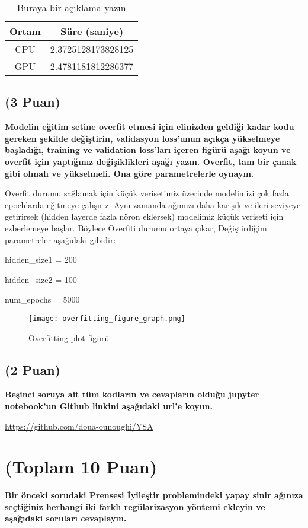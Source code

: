 \documentclass[11pt]{article}
\begin{document}
\begin{table}[ht!]
    \centering
    \caption{Buraya bir açıklama yazın}
    \begin{tabular}{c|c}
        Ortam & Süre (saniye) \\\hline
        CPU & 2.3725128173828125 \\
        GPU & 2.4781181812286377\\
    \end{tabular}
    \label{tab:my_table}
\end{table}

\subsection{(3 Puan)} \textbf{Modelin eğitim setine overfit etmesi için elinizden geldiği kadar kodu gereken şekilde değiştirin, validasyon loss'unun açıkça yükselmeye başladığı, training ve validation loss'ları içeren figürü aşağı koyun ve overfit için yaptığınız değişiklikleri aşağı yazın. Overfit, tam bir çanak gibi olmalı ve yükselmeli. Ona göre parametrelerle oynayın.}

Overfit durumu sağlamak için küçük verisetimiz üzerinde modelimizi çok fazla epochlarda eğitmeye çalışırız. Aynı zamanda ağımızı daha karışık ve ileri seviyeye getirirsek (hidden layerde fazla nöron eklersek) modelimiz küçük veriseti için ezberlemeye başlar. Böylece Overfiti durumu ortaya çıkar,
Değiştirdiğim parametreler aşağıdaki gibidir:

 hidden\_size1 = 200
 
 hidden\_size2 = 100
 
  num\_epochs = 5000
\begin{figure}[ht!]
    \centering
    \texttt{[image: overfitting\_figure\_graph.png]}
    \caption{Overfitting plot figürü}
    \label{fig:my_pic}
\end{figure}

\subsection{(2 Puan)} \textbf{Beşinci soruya ait tüm kodların ve cevapların olduğu jupyter notebook'un Github linkini aşağıdaki url'e koyun.}

\url{https://github.com/doua-ounoughi/YSA}

\section{(Toplam 10 Puan)} \textbf{Bir önceki sorudaki Prensesi İyileştir problemindeki yapay sinir ağınıza seçtiğiniz herhangi iki farklı regülarizasyon yöntemi ekleyin ve aşağıdaki soruları cevaplayın.} 
\end{document}
